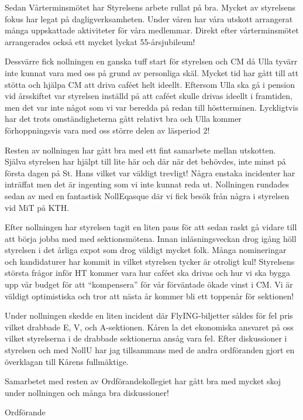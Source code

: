 \documentclass[../_main/handlingar.tex]{subfiles}
\begin{document}

Sedan Vårterminsmötet har Styrelsens arbete rullat på bra. Mycket av styrelsens fokus har legat på dagligverksamheten. Under våren har våra utskott arrangerat många uppskattade aktiviteter för våra medlemmar. Direkt efter vårterminsmötet arrangerades också ett mycket lyckat 55-årsjubileum!

Dessvärre fick nollningen en ganska tuff start för styrelsen och CM då Ulla tyvärr inte kunnat vara med oss på grund av personliga skäl. Mycket tid har gått till att stötta och hjälpa CM att driva caféet helt ideellt. Eftersom Ulla ska gå i pension vid årsskiftet var styrelsen inställd på att caféet skulle drivas ideellt i framtiden, men det var inte något som vi var beredda på redan till höstterminen. Lyckligtvis har det trots omständigheterna gått relativt bra och Ulla kommer förhoppningsvis vara med oss större delen av läsperiod 2!

Resten av nollningen har gått bra med ett fint samarbete mellan utskotten. Själva styrelsen har hjälpt till lite här och där när det behövdes, inte minst på första dagen på St. Hans vilket var väldigt trevligt! Några enstaka incidenter har inträffat men det är ingenting som vi inte kunnat reda ut. Nollningen rundades sedan av med en fantastisk NollEqasque där vi fick besök från några i styrelsen vid MiT på KTH.

Efter nollningen har styrelsen tagit en liten paus för att sedan raskt gå vidare till att börja jobba med med sektionsmötena. Innan inläsningsveckan drog igång höll styrelsen i det årliga expot som drog väldigt mycket folk. Många nomineringar och kandidaturer har kommit in vilket styrelsen tycker är otroligt kul! Styrelsens största frågor inför HT kommer vara hur caféet ska drivas och hur vi ska bygga upp vår budget för att ``kompensera'' för vår förväntade ökade vinst i CM. Vi är väldigt optimistiska och tror att nästa år kommer bli ett toppenår för sektionen!

Under nollningen skedde en liten incident där FlyING-biljetter såldes för fel pris vilket drabbade E, V, och A-sektionen. Kåren la det ekonomiska ansvaret på oss vilket styrelserna i de drabbade sektionerna ansåg vara fel. Efter diskussioner i styrelsen och med NollU har jag tillsammans med de andra ordföranden gjort en överklagan till Kårens fullmäktige.

Samarbetet med resten av Ordförandekollegiet har gått bra med mycket skoj under nollningen och många bra diskussioner!

\begin{signatures}{1}
    \mvh
    \signature{\ordf}{Ordförande}
\end{signatures}
\end{document}
